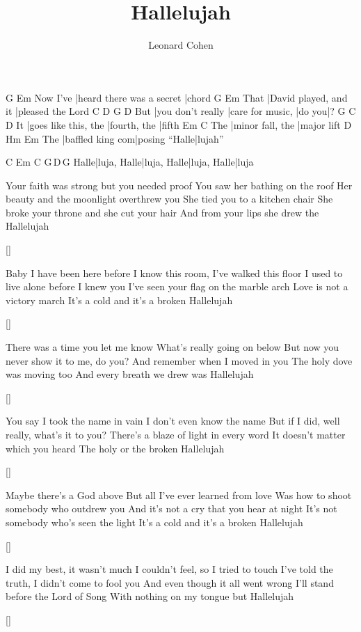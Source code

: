\documentclass{song}
\title{Hallelujah}
\author{Leonard Cohen}
\begin{document}
\begin{multicols}{2}

\strophe
         G                         Em
Now I've |heard there was a secret |chord
     G                     Em
That |David played, and it |pleased the Lord
    C                 D                G      D
But |you don't really |care for music, |do you|?
   G                    C            D
It |goes like this, the |fourth, the |fifth
    Em               C
The |minor fall, the |major lift
    D                Hm             Em
The |baffled king com|posing ``Halle|lujah''
\endstrophe

     C           Em          C           G\,D\,G
Halle|luja, Halle|luja, Halle|luja, Halle|luja
\endstrophe

\strophe
Your faith was strong but you needed proof
You saw her bathing on the roof
Her beauty and the moonlight overthrew you
She tied you to a kitchen chair
She broke your throne and she cut your hair
And from your lips she drew the Hallelujah
\endstrophe

\ref{}

\strophe*
Baby I have been here before
I know this room, I've walked this floor
I used to live alone before I knew you
I've seen your flag on the marble arch
Love is not a victory march
It's a cold and it's a broken Hallelujah
\endstrophe

\ref{}

\columnbreak

\strophe*
There was a time you let me know
What's really going on below
But now you never show it to me, do you?
And remember when I moved in you
The holy dove was moving too
And every breath we drew was Hallelujah
\endstrophe

\ref{}

\strophe*
You say I took the name in vain
I don't even know the name
But if I did, well really, what's it to you?
There's a blaze of light in every word
It doesn't matter which you heard
The holy or the broken Hallelujah
\endstrophe

\ref{}

\strophe*
Maybe there's a God above
But all I've ever learned from love
Was how to shoot somebody who outdrew you
And it's not a cry that you hear at night
It's not somebody who's seen the light
It's a cold and it's a broken Hallelujah
\endstrophe

\ref{}

\strophe*
I did my best, it wasn't much
I couldn't feel, so I tried to touch
I've told the truth, I didn't come to fool you
And even though it all went wrong
I'll stand before the Lord of Song
With nothing on my tongue but Hallelujah
\endstrophe

\ref{}

\end{multicols}
\end{document}
